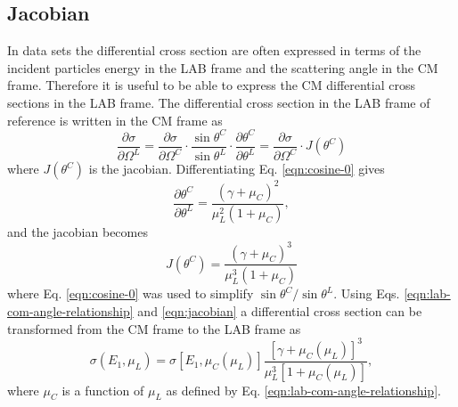 \documentclass[../main.tex]{subfiles}
\begin{document}
\subsection{Jacobian}
In data sets the differential cross section are often expressed in terms of the incident particles energy in the LAB frame and the scattering angle in the CM frame. Therefore it is useful to be able to express the CM differential cross sections in the LAB frame. The differential cross section in the LAB frame of reference is written in the CM frame as
\begin{equation}
  \dfrac{\partial \sigma}{\partial \Omega^L} = \dfrac{\partial \sigma}{\partial \Omega^C} \cdot \dfrac{\sin \theta^C}{\sin \theta^L} \cdot \dfrac{\partial \theta^C}{\partial \theta^L} = \dfrac{\partial \sigma}{\partial \Omega^C} \cdot J\left(\theta^C\right)
\end{equation}
where $J(\theta^C)$ is the jacobian. Differentiating Eq. \eqref{eqn:cosine-0} gives
\begin{equation}
  \dfrac{\partial \theta^C}{\partial \theta^L} = \dfrac{\left(\gamma + \mu_C\right)^2}{\mu_L^2 \left(1 + \mu_C\right)},
\end{equation}
and the jacobian becomes
\begin{equation} \label{eqn:jacobian}
  J(\theta^C) = \dfrac{\left(\gamma + \mu_C\right)^3}{\mu_L^3 \left(1 + \mu_C\right)}
\end{equation}
where Eq. \eqref{eqn:cosine-0} was used to simplify $\sin \theta^C / \sin \theta^L$. Using Eqs. \eqref{eqn:lab-com-angle-relationship} and \eqref{eqn:jacobian} a differential cross section can be transformed from the CM frame to the LAB frame as
\begin{equation}
  \sigma(E_1,\mu_L) = \sigma[E_1, \mu_C(\mu_L)] \dfrac{\left[\gamma + \mu_C(\mu_L)\right]^3}{\mu_L^3 \left[1 + \mu_C(\mu_L)\right]},
\end{equation}
where $\mu_C$ is a function of $\mu_L$ as defined by Eq. \eqref{eqn:lab-com-angle-relationship}.

\end{document}
